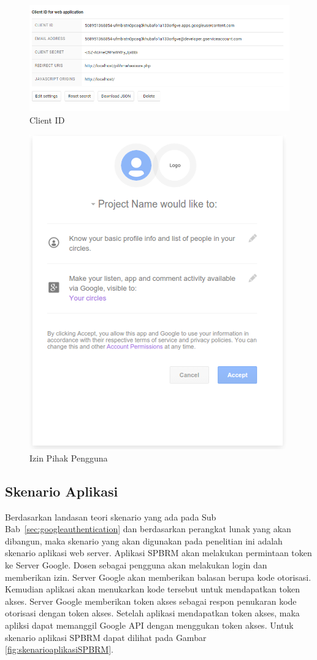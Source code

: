 \begin{figure}[ht]
\centering
\includegraphics[scale=0.5]{Gambar/clientid.png}
\caption[Client ID]{Client ID} 
\label{fig:clientid}
\end{figure}

\begin{figure}[ht]
\centering
\includegraphics[scale=0.5]{Gambar/izinpengguna.png}
\caption[Izin Pihak Pengguna]{Izin Pihak Pengguna} 
\label{fig:izinpengguna}
\end{figure}

\subsection{Skenario Aplikasi}
Berdasarkan landasan teori skenario yang ada pada Sub Bab~\ref{sec:googleauthentication} dan berdasarkan perangkat lunak yang akan dibangun, maka skenario yang akan digunakan pada penelitian ini adalah skenario aplikasi web server. Aplikasi SPBRM akan melakukan permintaan token ke Server Google. Dosen sebagai pengguna akan melakukan login dan memberikan izin. Server Google akan memberikan balasan berupa kode otorisasi. Kemudian aplikasi akan menukarkan kode tersebut untuk mendapatkan token akses. Server Google memberikan token akses sebagai respon penukaran kode otorisasi dengan token akses. Setelah aplikasi mendapatkan token akses, maka apliksi dapat memanggil Google API dengan menggukan token akses. Untuk skenario aplikasi SPBRM dapat dilihat pada Gambar \ref{fig:skenarioaplikasiSPBRM}.

